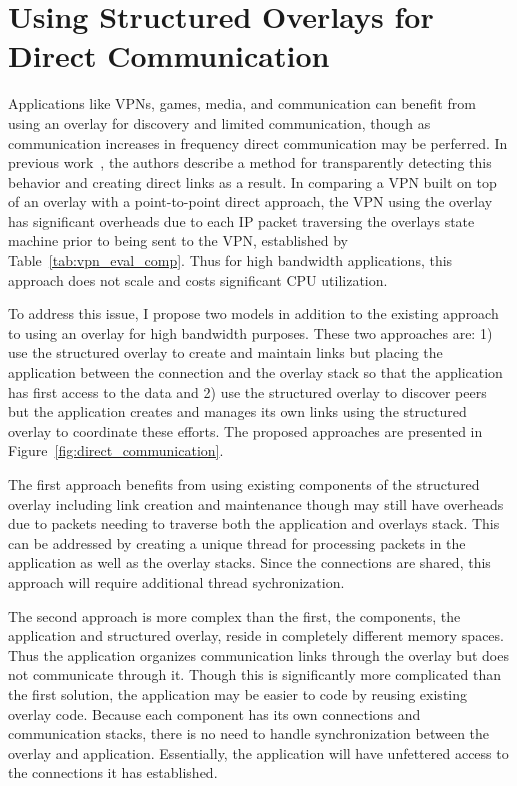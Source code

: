 \section{Using Structured Overlays for Direct Communication}
\label{direct_communication}
Applications like VPNs, games, media, and communication can benefit from using
an overlay for discovery and limited communication, though as communication
increases in frequency direct communication may be perferred.  In previous
work~\cite{wow}, the authors describe a method for transparently detecting this
behavior and creating direct links as a result.  In comparing a VPN built on
top of an overlay with a point-to-point direct approach, the VPN using the
overlay has significant overheads due to each IP packet traversing the overlays
state machine prior to being sent to the VPN, established by
Table~\ref{tab:vpn_eval_comp}.  Thus for high bandwidth applications, this
approach does not scale and costs significant CPU utilization.

To address this issue, I propose two models in addition to the existing
approach to using an overlay for high bandwidth purposes.  These two
approaches are:  1) use the structured overlay to create and maintain
links but placing the application between the connection and the overlay
stack so that the application has first access to the data and 2) use
the structured overlay to discover peers but the application creates and
manages its own links using the structured overlay to coordinate these
efforts.  The proposed approaches are presented in
Figure~\ref{fig:direct_communication}.

The first approach benefits from using existing components of the structured
overlay including link creation and maintenance though may still have overheads
due to packets needing to traverse both the application and overlays stack.
This can be addressed by creating a unique thread for processing packets in the
application as well as the overlay stacks.  Since the connections are shared,
this approach will require additional thread sychronization.

The second approach is more complex than the first, the components, the
application and structured overlay, reside in completely different memory
spaces.  Thus the application organizes communication links through the overlay
but does not communicate through it.  Though this is significantly more
complicated than the first solution, the application may be easier to code by
reusing existing overlay code.  Because each component has its own connections
and communication stacks, there is no need to handle synchronization between
the overlay and application.  Essentially, the application will have unfettered
access to the connections it has established.

